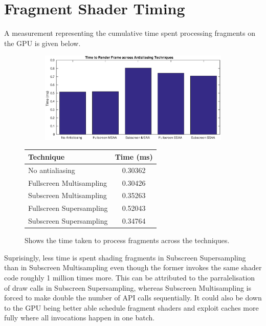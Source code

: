 \documentclass[12pt,a4paper,twoside,openright]{report}
\begin{document}
\clearpage

\section{Fragment Shader Timing}

A measurement representing the cumulative time spent processing fragments on the GPU is given below.

\begin{figure}[tbh]

 
\begin{subfigure}{0.5\textwidth}
\includegraphics[width=1.2\linewidth]{figs/timeToRenderFrame.eps}
\end{subfigure}
\qquad
\begin{tabular}{l|c}
Technique   & Time (ms) \\ 
\hline
No antialiasing      & 0.30362 \\
Fullscreen Multisampling     & 0.30426 \\
Subscreen Multisampling    &  0.35263  \\
Fullscreen Supersampling      &  0.52043   \\
Subscreen Supersampling    &  0.34764  \\
\end{tabular}
 
\caption{Shows the time taken to process fragments across the techniques.}
\end{figure}

Suprisingly, less time is spent shading fragments in Subscreen Supersampling than in Subscreen Multisampling even though the former invokes the same shader code roughly 1 million times more. This can be attributed to the parralelisation of draw calls in Subscreen Supersampling, whereas Subscreen Multisampling is forced to make double the number of API calls sequentially. It could also be down to the GPU being better able schedule fragment shaders and exploit caches more fully where all invocations happen in one batch.\\
\end{document}
